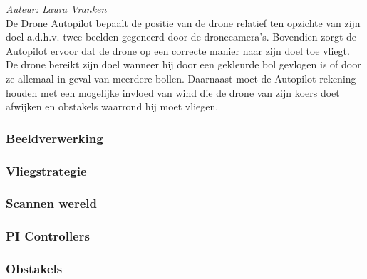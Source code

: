 {\em Auteur: Laura Vranken}\\

\noindent
De Drone Autopilot bepaalt de positie van de drone relatief ten opzichte van zijn doel a.d.h.v. twee beelden gegeneerd door de dronecamera's. Bovendien zorgt de Autopilot ervoor dat de drone op een correcte manier naar zijn doel toe vliegt. De drone bereikt zijn doel wanneer hij door een gekleurde bol gevlogen is of door ze allemaal in geval van meerdere bollen.  Daarnaast moet de Autopilot rekening houden met een mogelijke invloed van wind die de drone van zijn koers doet afwijken en obstakels waarrond hij moet vliegen.

\subsubsection{Beeldverwerking}
\label{subsec: Beeldverwerking}


\subsubsection{Vliegstrategie}
\label{subsec: Vliegstrategie}


\subsubsection{Scannen wereld}
\label{subsec: Scannen wereld}


\subsubsection{PI Controllers}
\label{subsec: PI Controllers}


\subsubsection{Obstakels}
\label{subsec: Obstakels}



















